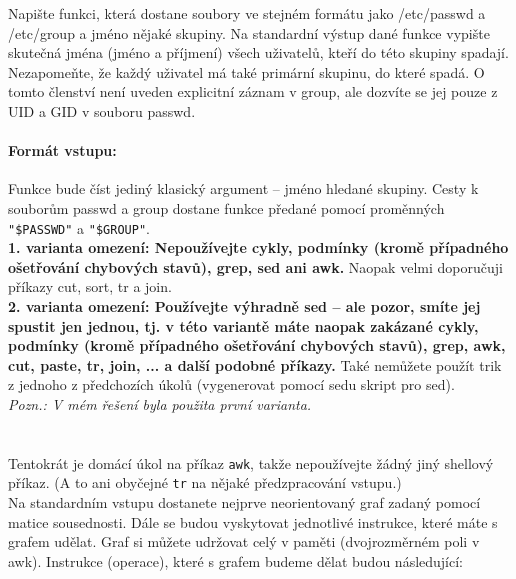 \documentclass{scrartcl}
\begin{document}
        Napište funkci, která dostane soubory ve stejném formátu jako /etc/passwd a /etc/group a jméno nějaké skupiny. Na standardní výstup dané funkce vypište skutečná jména (jméno a příjmení) všech uživatelů, kteří do této skupiny spadají. Nezapomeňte, že každý uživatel má také primární skupinu, do které spadá. O tomto členství není uveden explicitní záznam v group, ale dozvíte se jej pouze z UID a GID v souboru passwd. 

        \paragraph{Formát vstupu:}
        Funkce bude číst jediný klasický argument -- jméno hledané skupiny. Cesty k souborům passwd a group dostane funkce předané pomocí proměnných \texttt{"\$PASSWD"} a \texttt{"\$GROUP"}.\\

        \textbf{1. varianta omezení: Nepoužívejte cykly, podmínky (kromě případného ošetřování chybových stavů), grep, sed ani awk.}  Naopak velmi doporučuji příkazy cut, sort, tr a join.\\

        \textbf{2. varianta omezení: Používejte výhradně sed -- ale pozor, smíte jej spustit jen jednou, tj. v této variantě máte naopak zakázané cykly, podmínky (kromě případného ošetřování chybových stavů), grep, awk, cut, paste, tr, join, ... a další podobné příkazy.} Také nemůžete použít trik z jednoho z předchozích úkolů (vygenerovat pomocí sedu skript pro sed).\\

        \textit{Pozn.: V mém řešení byla použita první varianta.}

        \section{}
        Tentokrát je domácí úkol na příkaz \texttt{awk}, takže nepoužívejte žádný jiný shellový příkaz. (A to ani obyčejné \texttt{tr} na nějaké předzpracování vstupu.) \\

        Na standardním vstupu dostanete nejprve neorientovaný graf zadaný pomocí matice sousednosti. Dále se budou vyskytovat jednotlivé instrukce, které máte s grafem udělat. Graf si můžete udržovat celý v paměti (dvojrozměrném poli v awk). Instrukce (operace), které s grafem budeme dělat budou následující: 
\end{document}
